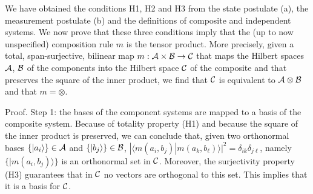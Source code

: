 \documentclass[aps,prl,amsmath,amssymb,twocolumn]{revtex4}
\theoremstyle{plain}
\theoremstyle{definition}
\theoremstyle{remark}
\def\>{\rangle}
\def\<{\langle}
\begin{document}
	We have obtained the conditions H1, H2 and H3 from the state postulate
	(a), the measurement postulate (b) and the definitions of composite
	and independent systems. We now prove that these three conditions
	imply that the (up to now unspecified) composition rule $m$ is the
	tensor product. More precisely, given a total, span-surjective,
	bilinear map $m:{\cal A}\times{\cal B}\to{\cal C}$ that maps the
	Hilbert spaces $\cal A$, $\cal B$ of the components into the Hilbert
	space $\cal C$ of the composite and that preserves the square of the
	inner product, we find that $\cal C $ is equivalent to
	$\cal A \otimes \cal B $ and that $m=\otimes$.
	
	Proof. Step 1: the bases of the component systems are mapped to a
	basis of the composite system. Because of totality property (H1) and
	because the square of the inner product is preserved, we can conclude
	that, given two orthonormal bases $\{|a_i\>\}\in{\cal A}$ and
	$\{|b_j\>\}\in{\cal B}$,
	$|\<m(a_i,b_j)|m(a_k,b_\ell)\>|^2=\delta_{ik}\delta_{j\ell}$, namely
	$\{|m(a_i,b_j)\>\}$ is an orthonormal set in $\cal C$.  Moreover, the
	surjectivity property (H3) guarantees that in $\cal C$ no vectors are
	orthogonal to this set. This implies that it is a basis for $\cal C$.
	
\end{document}
